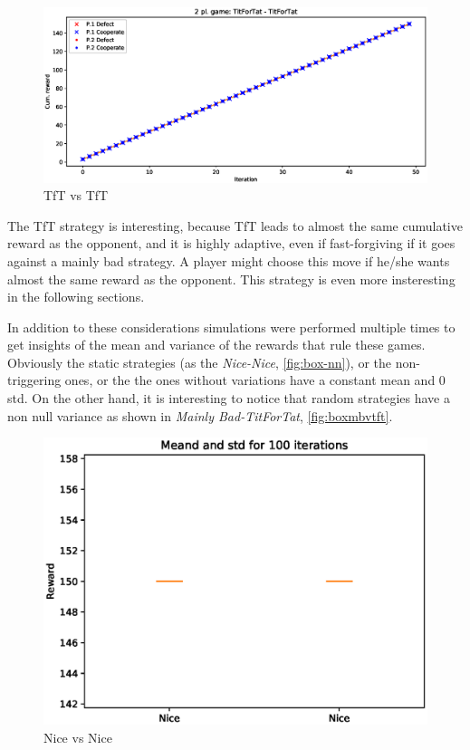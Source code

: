\documentclass[journal,a4paper,10pt,twoside]{IEEEtran} %
\begin{document}
\begin{figure}[!ht]
    \centering
    \includegraphics[width=1\columnwidth]{../img/ipd2p/ipd2p-rewards-TitForTat-TitForTat}
    \caption{TfT vs TfT}
    \label{fig:tftvstft}
\end{figure}

The TfT strategy is interesting, because TfT leads to almost the same cumulative reward as the opponent, and it is highly adaptive, even if fast-forgiving if it goes against a mainly bad strategy. 
A player might choose this move if he/she wants almost the same reward as the opponent. This strategy is even more insteresting in the following sections.

In addition to these considerations simulations were performed multiple times to get insights of the mean and variance of the rewards that rule these games. Obviously the static strategies (as the \textit{Nice-Nice}, \autoref{fig:box-nn}), or the non-triggering ones, or the the ones without variations have a constant mean and $0$ std. On the other hand, it is interesting to notice that random strategies have a non null variance as shown in \textit{Mainly Bad-TitForTat}, \autoref{fig:boxmbvtft}.

\begin{figure}[!ht]
    \centering
    \includegraphics[width=1\columnwidth]{../img/ipd2p/ipd2p-boxplot-Nice-Nice}
    \caption{Nice vs Nice}
    \label{fig:boxnn}
\end{figure}
\end{document}
